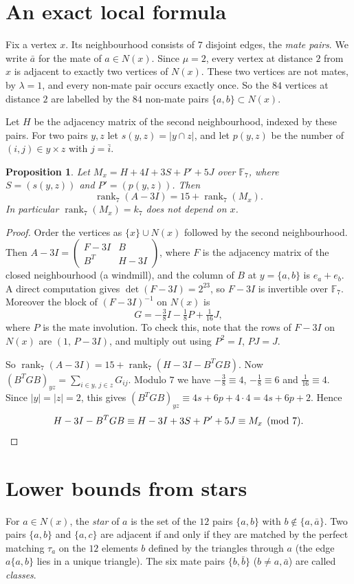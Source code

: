 \documentclass[11pt]{amsart}
\newtheorem{proposition}[theorem]{Proposition}
\theoremstyle{remark}
\newcommand{\F}{\mathbb{F}}
\DeclareMathOperator{\rk}{rank}
\begin{document}
\section{An exact local formula}\label{sec:local}
Fix a vertex $x$. Its neighbourhood consists of $7$ disjoint edges, the \emph{mate pairs}. We write $\bar a$ for the
mate of $a\in N(x)$. Since $\mu=2$, every vertex at distance $2$ from $x$ is adjacent to exactly two vertices of $N(x)$.
These two vertices are not mates, by $\lambda=1$, and every non-mate pair occurs exactly once. So the $84$ vertices at
distance $2$ are labelled by the $84$ non-mate pairs $\{a,b\}\subset N(x)$.

Let $H$ be the adjacency matrix of the second neighbourhood, indexed by these pairs. For two pairs $y,z$ let
$s(y,z)=|y\cap z|$, and let $p(y,z)$ be the number of $(i,j)\in y\times z$ with $j=\bar i$.

\begin{proposition}\label{prop:local}
Let $M_x=H+4I+3S+P'+5J$ over $\F_7$, where $S=(s(y,z))$ and $P'=(p(y,z))$. Then
\[
\rk_7(A-3I)=15+\rk_7(M_x).
\]
In particular $\rk_7(M_x)=k_7$ does not depend on $x$.
\end{proposition}
\begin{proof}
Order the vertices as $\{x\}\cup N(x)$ followed by the second neighbourhood. Then
$A-3I=\begin{pmatrix}F-3I&B\\ B^{T}&H-3I\end{pmatrix}$, where $F$ is the adjacency matrix of the closed neighbourhood
(a windmill), and the column of $B$ at $y=\{a,b\}$ is $e_a+e_b$. A direct computation gives
$\det(F-3I)=2^{23}$, so $F-3I$ is invertible over $\F_7$. Moreover the block of $(F-3I)^{-1}$ on $N(x)$ is
\[
G=-\tfrac38I-\tfrac18P+\tfrac1{16}J ,
\]
where $P$ is the mate involution. To check this, note that the rows of $F-3I$ on $N(x)$ are $(1,\,P-3I)$, and multiply
out using $P^2=I$, $PJ=J$.

So $\rk_7(A-3I)=15+\rk_7(H-3I-B^{T}GB)$. Now $(B^TGB)_{yz}=\sum_{i\in y,\,j\in z}G_{ij}$. Modulo $7$ we have
$-\tfrac38\equiv4$, $-\tfrac18\equiv6$ and $\tfrac1{16}\equiv4$. Since $|y|=|z|=2$, this gives
$(B^TGB)_{yz}\equiv4s+6p+4\cdot4=4s+6p+2$. Hence
\[
H-3I-B^TGB\equiv H-3I+3S+P'+5J\equiv M_x \pmod 7 .\qedhere
\]
\end{proof}

\section{Lower bounds from stars}\label{sec:lower}
For $a\in N(x)$, the \emph{star} of $a$ is the set of the $12$ pairs $\{a,b\}$ with $b\notin\{a,\bar a\}$. Two pairs
$\{a,b\}$ and $\{a,c\}$ are adjacent if and only if they are matched by the perfect matching $\tau_a$ on the $12$ elements
$b$ defined by the triangles through $a$ (the edge $a\{a,b\}$ lies in a unique triangle). The six mate pairs $\{b,\bar b\}$
($b\ne a,\bar a$) are called \emph{classes}.
\end{document}
